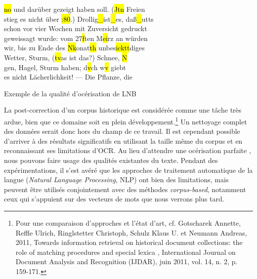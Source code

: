 \documentclass[a4paper,twoside,12pt]{article}
\begin{document}
\begin{table}[h]
\begin{varwidth}[b]{0.5\textwidth}
{{\hl{no\fg{}} und darüber gezeigt haben soll. (\hl{Jtn} Freien\\
stieg es nicht über \hl{:80}.) Drollig\hl{\_}ist\hl{\_}es, daß\hl{\_}utts\\
schon vor vier Wochen mit Zuversicht gedruckt\\
geweissagt wurde: vom 27\hl{f}ten M\hl{ei}rz an würden\\
wir, bis zu Ende des \hl{Nk}onat\hl{th} unbes\hl{icktt}diges\\
Wetter, Sturm, (\hl{tv}as ist das?) Schnee, \hl{N\fg{}}\\
gen, Hagel, Sturm haben; d\hl{v}ch w\hl{v} giebt\\
es nicht \hl{\fg{}}Lächerlichkeit! —\hl{\fg{}} Die Pflanze, die}}
  \end{varwidth}%
  \caption{Exemple de la qualité d'océrisation de LNB}
  \label{table:ocr}
\end{table}

La post-correction d'un corpus historique est considérée comme une tâche très ardue, bien que ce domaine soit en plein développement.\footnote{Pour une comparaison d'approches et l'état d'art, cf. Gotscharek Annette, Reffle Ulrich, Ringlstetter Christoph, Schulz Klaus U. et Neumann Andreas, 2011, \og Towards information retrieval on historical document collections: the role of matching procedures and special lexica \fg{}, International Journal on Document Analysis and Recognition (IJDAR), juin 2011, vol. 14, n. 2, p. 159‑171.} Un nettoyage complet des données serait donc hors du champ de ce travail. Il est cependant possible d'arriver à des résultats significatifs en utilisant la taille même du corpus et en reconnaissant ses limitations d'OCR. Au lieu d'attendre une océrisation \og parfaite \fg{}, nous pouvons faire usage des qualités existantes du texte. Pendant des expérimentations, il s'est avéré que les approches de traitement automatique de la langue (\textit{Natural Language Processing}, NLP) ont bien des limitations, mais peuvent être utilisés conjointement avec des méthodes \textit{corpus-based}, notamment ceux qui s'appuient sur des vecteurs de mots que nous verrons plus tard.
\end{document}
